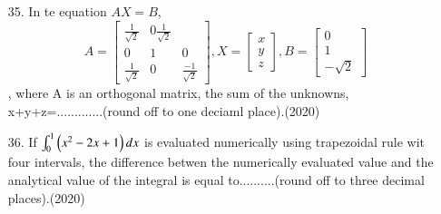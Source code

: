 \documentclass[journal]{IEEEtran}
\begin{document}
\begin{enumerate}
    \item[35.] In te equation $AX = B$, $$A = \begin{bmatrix}\frac{1}{\sqrt{2}}&0 \frac{1}{\sqrt{2}}\\0&1&0\\\frac{1}{\sqrt{2}}&0&\frac{-1}{\sqrt{2}}\end{bmatrix}, X =\begin{bmatrix}x\\y\\z \end{bmatrix}, B=\begin{bmatrix}0\\1\\-\sqrt{2} \end{bmatrix}$$, where A is an orthogonal matrix, the sum of the unknowns, x+y+z=.............(round off to one deciaml place).\hfill (2020)
    \item[36.] If $\int_{0}^{1}\left(x^2-2x+1\right)dx$ is evaluated numerically using trapezoidal rule wit four intervals, the difference betwen the numerically evaluated value and the analytical value of the integral is equal to..........(round off to three decimal places).\hfill (2020)
    

\end{enumerate}
\end{document}

